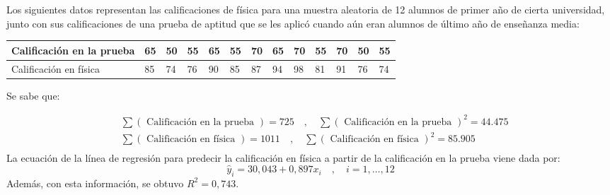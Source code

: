 
\addpoints
\question[20] Los siguientes datos representan las calificaciones de física para una muestra aleatoria de 12 alumnos de primer año de cierta universidad, junto con sus calificaciones de una prueba de aptitud que se les aplicó cuando aún eran alumnos de último año de enseñanza media:

\begin{table}[h!]
\centering
\begin{tabular}{|l|l|l|l|l|l|l|l|l|l|l|l|l|}
\hline Calificación en la prueba & 65 & 50 & 55 & 65 & 55 & 70 & 65 & 70 & 55 & 70 & 50 & 55 \\
\hline Calificación en física & 85 & 74 & 76 & 90 & 85 & 87 & 94 & 98 & 81 & 91 & 76 & 74 \\
\hline
\end{tabular}
\end{table}

Se sabe que:

\begin{align*}
&\sum(\text { Calificación en la prueba })=725 \quad, \quad \sum (\text{ Calificación en la prueba })^2=44.475 \\
&\sum(\text { Calificación en física })=1011 \quad, \quad \sum (\text{ Calificación en física })^2=85.905 \\
\end{align*}
La ecuación de la línea de regresión para predecir la calificación en física a partir de la calificación en la prueba viene dada por:
$$
\hat{y}_i=30,043+0,897 x_i \quad, \quad i=1, \ldots, 12
$$
Además, con esta información, se obtuvo $R^2=0,743$.

